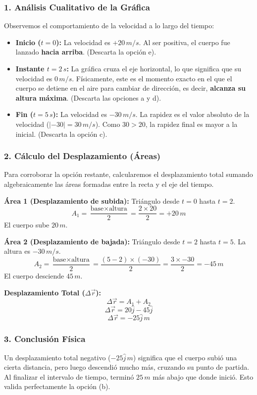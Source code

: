 \documentclass[12pt, a4paper]{article}
\begin{document}
\subsubsection*{1. Análisis Cualitativo de la Gráfica}
Observemos el comportamiento de la velocidad a lo largo del tiempo:
\begin{itemize}
    \item \textbf{Inicio ($t=0$):} La velocidad es $+20 \, \si{m/s}$. Al ser positiva, el cuerpo fue lanzado \textbf{hacia arriba}. (Descarta la opción e).
    \item \textbf{Instante $t=2 \, \si{s}$:} La gráfica cruza el eje horizontal, lo que significa que su velocidad es $0 \, \si{m/s}$. Físicamente, este es el momento exacto en el que el cuerpo se detiene en el aire para cambiar de dirección, es decir, \textbf{alcanza su altura máxima}. (Descarta las opciones a y d).
    \item \textbf{Fin ($t=5 \, \si{s}$):} La velocidad es $-30 \, \si{m/s}$. La rapidez es el valor absoluto de la velocidad ($|-30| = 30 \, \si{m/s}$). Como $30 > 20$, la rapidez final es mayor a la inicial. (Descarta la opción c).
\end{itemize}

\subsubsection*{2. Cálculo del Desplazamiento (Áreas)}
Para corroborar la opción restante, calcularemos el desplazamiento total sumando algebraicamente las áreas formadas entre la recta y el eje del tiempo.

\textbf{Área 1 (Desplazamiento de subida):} Triángulo desde $t=0$ hasta $t=2$.
$$ A_1 = \frac{\text{base} \times \text{altura}}{2} = \frac{2 \times 20}{2} = +20 \, \si{m} $$
El cuerpo sube $20 \, \si{m}$.

\textbf{Área 2 (Desplazamiento de bajada):} Triángulo desde $t=2$ hasta $t=5$. La altura es $-30 \, \si{m/s}$.
$$ A_2 = \frac{\text{base} \times \text{altura}}{2} = \frac{(5-2) \times (-30)}{2} = \frac{3 \times -30}{2} = -45 \, \si{m} $$
El cuerpo desciende $45 \, \si{m}$.

\textbf{Desplazamiento Total ($\Delta\vec{r}$):}
$$ \Delta\vec{r} = A_1 + A_2 $$
$$ \Delta\vec{r} = 20\hat{j} - 45\hat{j} $$
$$ \Delta\vec{r} = -25\hat{j} \, \si{m} $$

\subsubsection*{3. Conclusión Física}
Un desplazamiento total negativo ($-25\hat{j} \, \si{m}$) significa que el cuerpo subió una cierta distancia, pero luego descendió mucho más, cruzando su punto de partida. Al finalizar el intervalo de tiempo, terminó $25 \, \si{m}$ más abajo que donde inició. Esto valida perfectamente la opción (b).
\end{document}
